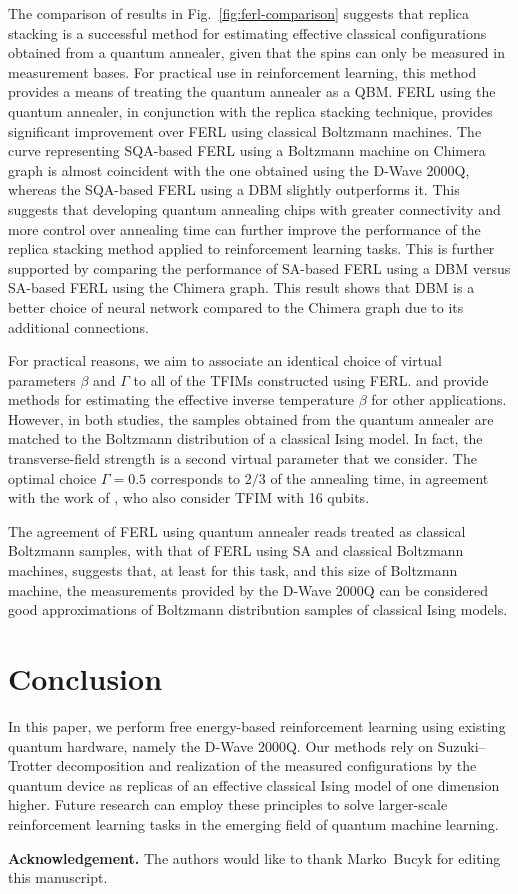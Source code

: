 \documentclass[pra,twocolumn,floatfix,superscriptaddress]{revtex4}
\begin{document}
The comparison of results in Fig.~\ref{fig:ferl-comparison} suggests that replica stacking is a successful method for estimating effective classical configurations obtained from a quantum annealer, given that the spins can only be measured in measurement bases. For practical use in reinforcement learning, this method provides a means of treating the quantum annealer as a QBM. FERL using the quantum annealer, in conjunction with the replica stacking technique, provides significant improvement over FERL using classical Boltzmann machines. The curve representing SQA-based FERL using a Boltzmann machine on Chimera graph is almost coincident with the one obtained using the D-Wave 2000Q, whereas the SQA-based FERL using a DBM slightly outperforms it. This suggests that developing quantum annealing chips with greater connectivity and more control over annealing time can further improve the performance of the replica stacking method applied to reinforcement learning tasks. This is further supported by comparing the performance of SA-based FERL using a DBM versus SA-based FERL using the Chimera graph. This result shows that DBM is a better choice of neural network compared to the Chimera graph due to its additional connections.  

For practical reasons, we aim to associate an identical choice of virtual parameters $\beta$ and $\Gamma$ to all of the TFIMs constructed using FERL. \citet{PhysRevA.94.022308} and \citet{10.3389} provide methods for estimating the effective inverse temperature $\beta$ for other applications. However, in both studies, the samples obtained from the quantum annealer are matched to the Boltzmann distribution of a classical Ising model. In fact, the transverse-field strength is a second virtual parameter that we consider. The optimal choice $\Gamma = 0.5$ corresponds to $2/3$ of the annealing time, in agreement with the work of \cite{amin2015searching}, who also consider TFIM with 16 qubits. 

The agreement of FERL using quantum annealer reads treated as classical Boltzmann samples, with that of FERL using SA and classical Boltzmann machines, suggests that, at least for this task, and this size of Boltzmann machine, the   
measurements provided by the D-Wave 2000Q can be considered good approximations of Boltzmann distribution samples of classical Ising models.

\section{Conclusion} 

In this paper, we perform free energy-based reinforcement learning using existing quantum hardware, namely the D-Wave 2000Q. Our methods rely on Suzuki--Trotter decomposition and realization of the measured configurations by the quantum device as replicas of an effective classical Ising model of one dimension higher. Future research can employ these principles to solve larger-scale reinforcement learning tasks in the emerging field of quantum machine learning. 

{\bf Acknowledgement.} The authors would like to thank Marko~Bucyk for editing this manuscript.  

\small

\end{document}
